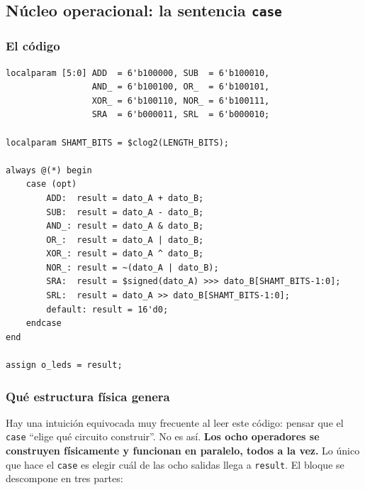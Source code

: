 \documentclass[12pt,a4paper]{article}
\begin{document}
\subsection{Núcleo operacional: la sentencia \texttt{case}}
\label{sec:case}

\subsubsection{El código}

\begin{lstlisting}[caption={Núcleo operacional de la ALU.},label={lst:case}]
localparam [5:0] ADD  = 6'b100000, SUB  = 6'b100010,
                 AND_ = 6'b100100, OR_  = 6'b100101,
                 XOR_ = 6'b100110, NOR_ = 6'b100111,
                 SRA  = 6'b000011, SRL  = 6'b000010;

localparam SHAMT_BITS = $clog2(LENGTH_BITS);

always @(*) begin
    case (opt)
        ADD:  result = dato_A + dato_B;
        SUB:  result = dato_A - dato_B;
        AND_: result = dato_A & dato_B;
        OR_:  result = dato_A | dato_B;
        XOR_: result = dato_A ^ dato_B;
        NOR_: result = ~(dato_A | dato_B);
        SRA:  result = $signed(dato_A) >>> dato_B[SHAMT_BITS-1:0];
        SRL:  result = dato_A >> dato_B[SHAMT_BITS-1:0];
        default: result = 16'd0;
    endcase
end

assign o_leds = result;
\end{lstlisting}

\subsubsection{Qué estructura física genera}

Hay una intuición equivocada muy frecuente al leer este código: pensar que el
\texttt{case} ``elige qué circuito construir''. No es así. \textbf{Los ocho
operadores se construyen físicamente y funcionan en paralelo, todos a la vez.}
Lo único que hace el \texttt{case} es elegir cuál de las ocho salidas llega a
\texttt{result}. El bloque se descompone en tres partes:
\end{document}

